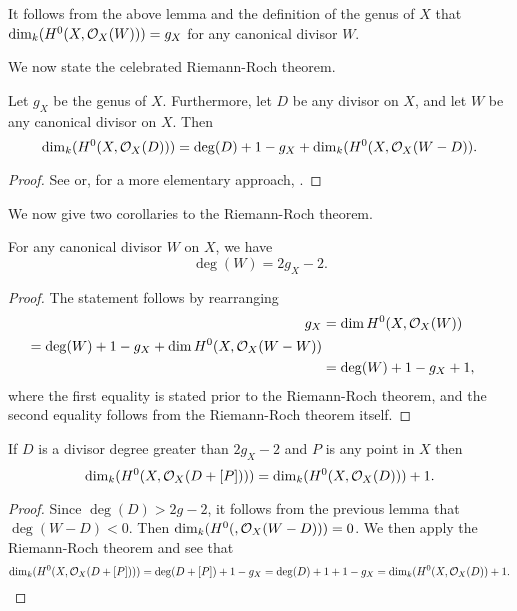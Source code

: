 It follows from the above lemma and the definition of the genus of $X$ that $\dim_k(H^0(X,{\cal O}_X(W))) = g_X$ for any canonical divisor $W$.

We now state the celebrated Riemann-Roch theorem.

    \begin{thm}\label{theoremriemannroch}
    Let $g_X$ be the genus of $X$.
    Furthermore, let $D$ be any divisor on $X$, and let $W$ be any canonical divisor on $X$.
    Then
        \[
        \dim_k(H^0(X,{\cal O}_X(D))) = \deg(D) + 1 - g_X + \dim_k(H^0(X,{\cal O}_X(W-D)).
        \]
    \end{thm}
    \begin{proof}
    See \cite[Chap.\ IV, \S 1, Thm.\ 1.3]{hart} or, for a more elementary approach, \cite[Chap.\ 8, \S 6]{fulton}.
    \end{proof}


We now give two corollaries to the Riemann-Roch theorem.

    \begin{cor}\label{dim=gc}
    For any canonical divisor $W$ on $X$, we have 
        \[
        \deg(W) = 2g_X-2.
        \]
    \end{cor}
    \begin{proof}
    The statement follows by rearranging
        \begin{align*}
        g_X & = \dim H^0(X,{\cal O}_X(W)) & \\ = \deg(W) + 1 -g_X +  \dim H^0(X,{\cal O}_X(W-W))\\ & = \deg(W) + 1 -g_X + 1,
        \end{align*}
    where the first equality is stated prior to the Riemann-Roch theorem, and the second equality follows from the Riemann-Roch theorem itself.
    \end{proof}

    \begin{cor}
    If $D$ is a divisor degree greater than $2g_X-2$ and $P$ is any point in $X$ then
        \[
        \dim_k(H^0(X,{\cal O}_X(D +[P]))) = \dim_k(H^0(X,{\cal O}_X(D))) + 1.
        \]
    \end{cor}
    \begin{proof}
    Since $\deg(D) > 2g-2$, it follows from the previous lemma that $\deg(W-D) <0$.
    Then $\dim_k(H^0(,{\cal O}_X(W - D)))  = 0$.
    We then apply the Riemann-Roch theorem and see that
        \[
        \dim_k(H^0(X,{\cal O}_X(D + [P]))) = \deg(D +[P]) + 1 - g_X = \deg(D) + 1 + 1 - g_X = \dim_k(H^0(X,{\cal O}_X(D)) + 1.
        \]
    \end{proof}


